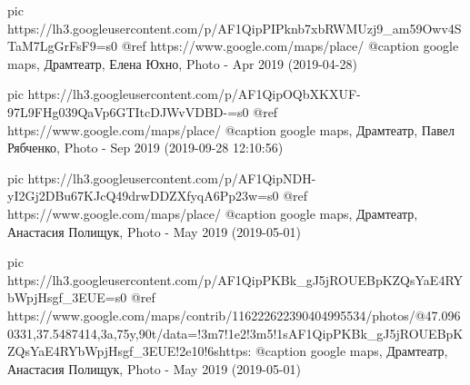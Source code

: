 
     pic https://lh3.googleusercontent.com/p/AF1QipPIPknb7xbRWMUzj9_am59Owv4STaM7LgGrFsF9=s0
     @ref https://www.google.com/maps/place/%
     @caption google maps, Драмтеатр, Елена Юхно, Photo - Apr 2019 (2019-04-28)

     pic https://lh3.googleusercontent.com/p/AF1QipOQbXKXUF-97L9FHg039QaVp6GTItcDJWvVDBD-=s0
     @ref https://www.google.com/maps/place/%
     @caption google maps, Драмтеатр, Павел Рябченко, Photo - Sep 2019 (2019-09-28 12:10:56)

     pic https://lh3.googleusercontent.com/p/AF1QipNDH-yI2Gj2DBu67KJcQ49drwDDZXfyqA6Pp23w=s0
     @ref https://www.google.com/maps/place/%
     @caption google maps, Драмтеатр, Анастасия Полищук, Photo - May 2019 (2019-05-01)

     pic https://lh3.googleusercontent.com/p/AF1QipPKBk_gJ5jROUEBpKZQsYaE4RYbWpjHsgf_3EUE=s0
     @ref https://www.google.com/maps/contrib/116222622390404995534/photos/@47.0960331,37.5487414,3a,75y,90t/data=!3m7!1e2!3m5!1sAF1QipPKBk_gJ5jROUEBpKZQsYaE4RYbWpjHsgf_3EUE!2e10!6shttps:%
     @caption google maps, Драмтеатр, Анастасия Полищук, Photo - May 2019 (2019-05-01)

